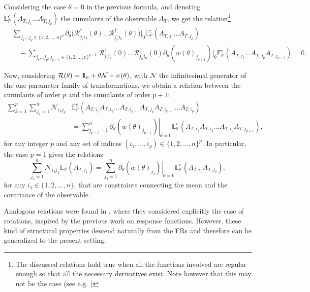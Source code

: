 \documentclass[a4paper,11pt]{article}
\numberwithin{equation}{section}
\newcommand{\bbbone}{\mathchoice {\rm 1\mskip-4mu l} {\rm 1\mskip-4mu l}
{\rm 1\mskip-4.5mu l} {\rm 1\mskip-5mu l}}
\begin{document}
Considering the case $\theta=0$ in the previous formula, and denoting $\mathbb{E}_{\mathbb{P}}^c(A_{T,j_1}\ldots A_{T,j_p})$ the cumulants of the observable $A_T$, we get the relation\footnote{The discussed relations hold true when all the functions involved are regular enough so that all the necessary derivatives exist. Note however that this may not be the case (see e.g. \cite{Por10})}
\begin{align}
 & \sum_{j_{1}\ldots j_{p}\in\{1,2,\ldots,n \}^{p}} \partial_\theta \Big( \mathcal{R}^\dag_{j_1 i_1}(\theta) \ldots \mathcal{R}^\dag_{j_p i_p}(\theta) \Big) \Big|_{0}\mathbb{E}_{\mathbb{P}}^c(A_{T,j_1}\ldots A_{T,j_p}) \nonumber \\
 &\quad - \sum_{j_{1}\ldots j_{p},j_{p+1}\in\{1,2,\ldots,n \}^{p+1}}  \mathcal{R}^\dag_{j_1 i_1}(0) \ldots \mathcal{R}^\dag_{j_n i_n}(0) \partial_\theta (w(\theta)_{ j_{p+1}})\Big|_{0} \mathbb{E}_{\mathbb{P}}^c(A_{T,j_1}\ldots A_{T,j_p}A_{T,j_{p+1}}) =0.
\end{align}


Now, considering $\mathcal{R}(\theta)=\bbbone_n +\theta\mathcal{N}+o\left(\theta\right)$,
with $\mathcal{N}$  the infinitesimal generator of the one-parameter family of transformations,
we obtain a relation between the cumulants of order $p$ and the cumulants of order $p+1$: 
\begin{align}
\sum_{k=1}^{p}\sum_{j_{k}=1}^{n}\mathcal{N}_{i_{k}j_{k}}&\mathbb{E}_{\mathbb{P}}^{c}\left(A_{T,i_{1}}A_{T,i_{2}}...A_{T,i_{k-1}}A_{T,j_{k}}A_{T,i_{k+1}}...A_{T,i_{p}}\right) \nonumber \\
&=\sum_{j_{p+1}=1}^{n}\left.\partial_{\theta}\left(w(\theta)_{j_{p+1}}\right)\right|_{\theta=0}\mathbb{E}_{\mathbb{P}}^{c}\left(A_{T,i_{1}}A_{T,i_{2}}...A_{T,i_{p}}A_{T,j_{p+1}}\right),
\label{eq:BeauG}
\end{align} 
for any integer $p$ and any set of indices $(i_1,\ldots, i_p) \in \{1,2,\ldots,n \}^{p}$.  In particular, the case $p=1$ gives the relations 
\begin{equation}
\sum_{j_{1}=1}^{n}\mathcal{N}_{i_{1}j_{1}}\mathbb{E}_{\mathbb{P}}\left(A_{T,j_{1}}\right)=\sum_{j_{2}=1}^{n}\left.\partial_{\theta}\left(w(\theta)_{j_{2}}\right)\right|_{\theta=0}\mathbb{E}_{\mathbb{P}}^{c}\left(A_{T,i_{1}}A_{T,j_{2}}\right) ,
\label{eq:Beau1}
\end{equation}
for any $i_1 \in \{1,2,\ldots,n \}$, that are constraints connecting the mean and the covariance of the observable.

Analogous relations were found in \cite{Hur+14}, where they considered explicitly the case of rotations, inspired by the previous work \cite{AG07} on response functions. However, these kind of structural properties descend naturally from the FRs and therefore can be generalized to the present setting. 
\end{document}
